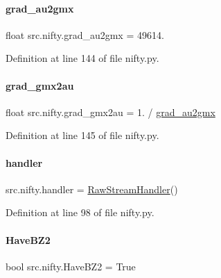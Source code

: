 \mbox{\label{namespacesrc_1_1nifty_a829aae1bd9a882de17c5348ecbc4a5b4}} 
\paragraph{\texorpdfstring{grad\+\_\+au2gmx}{grad\_au2gmx}}
{\footnotesize\ttfamily float src.\+nifty.\+grad\+\_\+au2gmx = 49614.}



Definition at line 144 of file nifty.\+py.

\mbox{\label{namespacesrc_1_1nifty_ab26986e6d355138d9adb83b402e7c48d}} 
\paragraph{\texorpdfstring{grad\+\_\+gmx2au}{grad\_gmx2au}}
{\footnotesize\ttfamily float src.\+nifty.\+grad\+\_\+gmx2au = 1. / \hyperlink{namespacesrc_1_1nifty_a829aae1bd9a882de17c5348ecbc4a5b4}{grad\+\_\+au2gmx}}



Definition at line 145 of file nifty.\+py.

\mbox{\label{namespacesrc_1_1nifty_a599f84c26888697b2045441d2c712c6e}} 
\paragraph{\texorpdfstring{handler}{handler}}
{\footnotesize\ttfamily src.\+nifty.\+handler = \hyperlink{classsrc_1_1nifty_1_1RawStreamHandler}{Raw\+Stream\+Handler}()}



Definition at line 98 of file nifty.\+py.

\mbox{\label{namespacesrc_1_1nifty_ad6f6a6beeecef1286072c627406a3ff2}} 
\paragraph{\texorpdfstring{Have\+B\+Z2}{HaveBZ2}}
{\footnotesize\ttfamily bool src.\+nifty.\+Have\+B\+Z2 = True}



